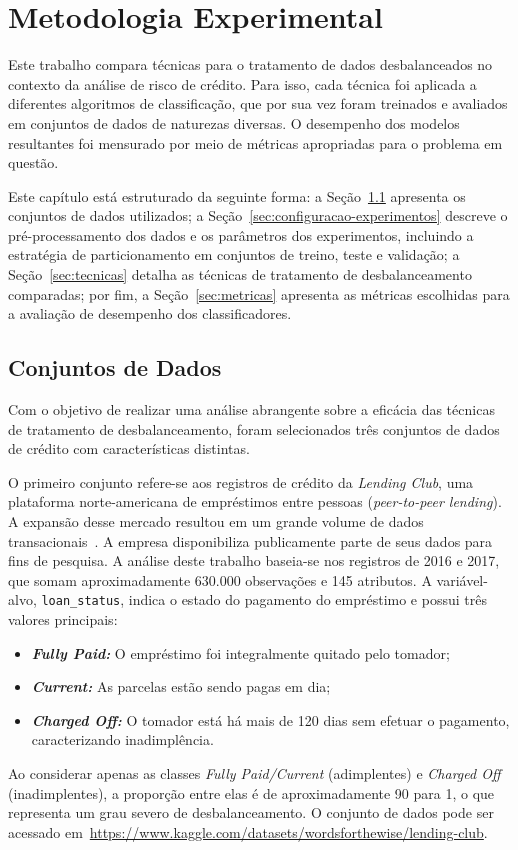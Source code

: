 \chapter{Metodologia Experimental}\label{cap:ferramentas}

Este trabalho compara técnicas para o tratamento de dados desbalanceados no contexto da análise de risco de crédito. Para isso, cada técnica foi aplicada a diferentes algoritmos de classificação, que por sua vez foram treinados e avaliados em conjuntos de dados de naturezas diversas. O desempenho dos modelos resultantes foi mensurado por meio de métricas apropriadas para o problema em questão.

Este capítulo está estruturado da seguinte forma: a Seção~\ref{sec:datasets} apresenta os conjuntos de dados utilizados; a Seção~\ref{sec:configuracao-experimentos} descreve o pré-processamento dos dados e os parâmetros dos experimentos, incluindo a estratégia de particionamento em conjuntos de treino, teste e validação; a Seção~\ref{sec:tecnicas} detalha as técnicas de tratamento de desbalanceamento comparadas; por fim, a Seção~\ref{sec:metricas} apresenta as métricas escolhidas para a avaliação de desempenho dos classificadores.

\section{Conjuntos de Dados}\label{sec:datasets}

Com o objetivo de realizar uma análise abrangente sobre a eficácia das técnicas de tratamento de desbalanceamento, foram selecionados três conjuntos de dados de crédito com características distintas.

O primeiro conjunto refere-se aos registros de crédito da \textit{Lending Club}, uma plataforma norte-americana de empréstimos entre pessoas (\textit{peer-to-peer lending}). A expansão desse mercado resultou em um grande volume de dados transacionais~\cite{Namvar2018}. A empresa disponibiliza publicamente parte de seus dados para fins de pesquisa. A análise deste trabalho baseia-se nos registros de 2016 e 2017, que somam aproximadamente \(630.000\) observações e 145 atributos. A variável-alvo, \texttt{loan\_status}, indica o estado do pagamento do empréstimo e possui três valores principais:
\begin{itemize}
  \item \textbf{\textit{Fully Paid:}} O empréstimo foi integralmente quitado pelo tomador;
  \item \textbf{\textit{Current:}} As parcelas estão sendo pagas em dia;
  \item \textbf{\textit{Charged Off:}} O tomador está há mais de 120 dias sem efetuar o pagamento, caracterizando inadimplência.
\end{itemize}
Ao considerar apenas as classes \textit{Fully Paid/Current} (adimplentes) e \textit{Charged Off} (inadimplentes), a proporção entre elas é de aproximadamente 90 para 1, o que representa um grau severo de desbalanceamento. O conjunto de dados pode ser acessado em~\url{https://www.kaggle.com/datasets/wordsforthewise/lending-club}.

